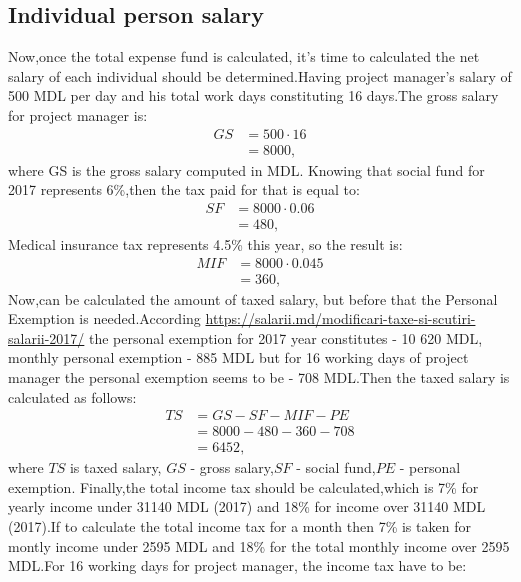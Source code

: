 \subsection{Individual person salary}
Now,once the total expense fund is calculated, it's time to calculated the net salary of each individual should be determined.Having project manager's salary of 500 MDL per day and his total work days constituting  16 days.The gross salary for project manager is:
\begin{equation}
\label{eq:sf}
	\begin{split}
	GS  &=  500 \cdot 16\\ 
	&= 8000,
	\end{split}
\end{equation}
where GS is the gross salary computed in MDL.
Knowing that social fund for 2017 represents 6\%,then the tax paid for that is equal to:
\begin{equation}
\label{eq:sf}
	\begin{split}
	SF  &=  8000 \cdot 0.06\\ 
	&= 480,
	\end{split}
\end{equation}
Medical insurance tax represents 4.5\% this year, so the result is:
\begin{equation}
\label{eq:sf}
	\begin{split}
	MIF  &=  8000 \cdot 0.045\\ 
	&= 360,
	\end{split}
\end{equation}
Now,can be calculated the amount of taxed salary, but before that the Personal Exemption is needed.According \url{https://salarii.md/modificari-taxe-si-scutiri-salarii-2017/} \cite{salarii} the personal exemption for 2017 year constitutes - 10 620 MDL, monthly personal exemption - 885 MDL but for 16 working days of project manager the personal exemption seems to be - 708 MDL.Then the taxed salary is calculated as follows:
\begin{equation}
\label{eq:sf}
\begin{split}
TS  &=  GS - SF - MIF - PE\\ 
&= 8000 - 480 - 360 - 708\\
&= 6452,
\end{split}
\end{equation}
where $TS$ is taxed salary, $GS$ - gross salary,$SF$ - social fund,$PE$ - personal exemption.
Finally,the total income tax should be calculated,which is 7\% for yearly income under 31140 MDL (2017) and 18\% for income over 31140 MDL (2017).If to calculate the total income tax for a month then 7\% is taken for montly income under 2595 MDL and 18\% for the total monthly income over 2595 MDL.For 16 working days for project manager, the income tax have to be: \\

